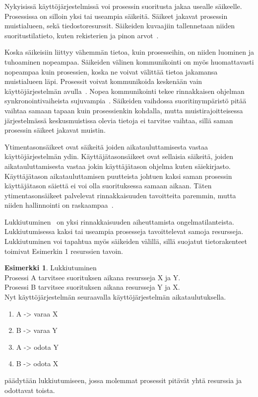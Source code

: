 \documentclass[finnish]{tktltiki2}
\theoremstyle{definition}
\newtheorem{esim}[lau]{Esimerkki}
\theoremstyle{remark}
\begin{document}
Nykyisissä käyttöjärjestelmissä voi prosessin suoritusta jakaa usealle
säikeelle. Prosessissa on silloin yksi tai useampia säikeitä.
Säikeet jakavat prosessin muistialueen, sekä tiedostoresurssit.
Säikeiden kuvaajiin
tallennetaan niiden suoritustilatieto,
kuten rekisterien ja pinon arvot~\cite{stallings_operating_2018}.

Koska säikeisiin liittyy vähemmän tietoa, kuin prosesseihin,
on niiden luominen ja tuhoaminen nopeampaa. Säikeiden välinen
kommunikointi on myös huomattavasti nopeampaa kuin prosessien, koska
ne voivat välittää tietoa jakamansa muistialueen läpi.
Prosessit voivat kommunikoida keskenään vain käyttöjärjestelmän
avulla~\cite{stallings_operating_2018}.
Nopea
kommunikointi tekee rinnakkaisen ohjelman synkronointivaiheista
sujuvampia~\cite{stallings_operating_2018}. Säikeiden vaihdossa suoritinympäristö pitää vaihtaa
samaan tapaan kuin prosessienkin kohdalla, mutta muistirajoitteisessa 
järjestelmässä keskusmuistissa olevia
tietoja ei tarvitse vaihtaa, sillä saman prosessin säikeet jakavat
muistin.

Ytimentasonsäikeet ovat säikeitä joiden aikatauluttamisesta vastaa
käyttöjärjestelmän ydin. Käyttäjätasonsäikeet ovat sellaisia säikeitä,
joiden aikatauluttamisesta vastaa jokin käyttäjätason ohjelma kuten
säiekirjasto. Käyttäjätason aikatauluttamisen puutteista johtuen
kaksi saman prosessin käyttäjätason säiettä ei voi olla suorituksessa
samaan aikaan. Täten ytimentasonsäikeet palvelevat rinnakkaisuuden tavoitteita
paremmin, mutta niiden hallinnointi on raskaampaa~\cite{stallings_operating_2018}.

Lukkiutuminen~\cite{stallings_operating_2018}
on yksi rinnakkaisuuden aiheuttamista ongelmatilanteista.
Lukkiutumisessa kaksi tai useampia prosesseja tavoittelevat samoja resursseja.
Lukkiutuminen voi tapahtua myös säikeiden välillä, sillä
suojatut tietorakenteet toimivat Esimerkin 1 resurssien tavoin.

\begin{center}
\begin{esim}
 Lukkiutuminen \\
 Prosessi A tarvitsee suorituksen aikana resursseja X ja Y. \\
 Prosessi B tarvitsee suorituksen aikana resursseja Y ja X. \\
 Nyt käyttöjärjestelmän seuraavalla käyttöjärjestelmän aikataulutuksella.
 \begin{enumerate}
  \item A -> varaa X
  \item B -> varaa Y
  \item A -> odota Y
  \item B -> odota X 
 \end{enumerate}
 päädytään lukkiutumiseen, jossa molemmat prosessit
 pitävät yhtä resurssia ja odottavat toista.
\end{esim}
\end{center}
\end{document}
